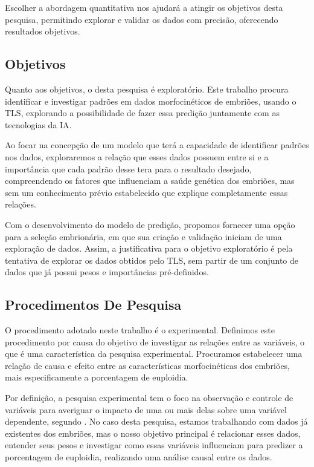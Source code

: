 Escolher a abordagem quantitativa nos ajudará a atingir os objetivos desta pesquisa, permitindo explorar e validar os dados com precisão, oferecendo resultados objetivos. 

\subsection{Objetivos}

Quanto aos objetivos, o desta pesquisa é exploratório. Este trabalho procura identificar e investigar padrões em dados morfocinéticos de embriões, usando o TLS, explorando a possibilidade de fazer essa predição juntamente com as tecnologias da IA. 

Ao focar na concepção de um modelo que terá a capacidade de identificar padrões nos dados, exploraremos a relação que esses dados possuem entre si e a importância que cada padrão desse tera para o resultado desejado, compreendendo os fatores que influenciam a saúde genética dos embriões, mas sem um conhecimento prévio estabelecido que explique completamente essas relações.

Com o desenvolvimento do modelo de predição, propomos fornecer uma opção para a seleção embrionária, em que sua criação e validação iniciam de uma exploração de dados. Assim, a justificativa para o objetivo exploratório é pela tentativa de explorar os dados obtidos pelo TLS, sem partir de um conjunto de dados que já possui pesos e importâncias pré-definidos. 

\subsection{Procedimentos De Pesquisa}

O procedimento adotado neste trabalho é o experimental. Definimos este procedimento por causa do objetivo de investigar as relações entre as variáveis, o que é uma característica da pesquisa experimental. Procuramos estabelecer uma relação de causa e efeito entre as características morfocinéticas dos embriões, mais especificamente a porcentagem de euploidia.

Por definição, a pesquisa experimental tem o foco na observação e controle de variáveis para averiguar o impacto de uma ou mais delas sobre uma variável dependente, segundo . No caso desta pesquisa, estamos trabalhando com dados já existentes dos embriões, mas o nosso objetivo principal é relacionar esses dados, entender seus pesos e investigar como essas variáveis influenciam para predizer a porcentagem de euploidia, realizando uma análise causal entre os dados. 

